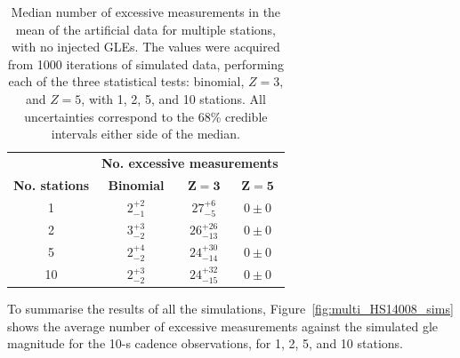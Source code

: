 \vspace{1em}

\begin{table}[ht!]
	\begin{center}
		\caption{Median number of excessive measurements in the mean of the artificial data for multiple stations, with no injected GLEs. The values were acquired from 1000 iterations of simulated data, performing each of the three statistical tests: binomial, $Z=3$, and $Z=5$, with 1, 2, 5, and 10 stations. All uncertainties correspond to the 68\% credible intervals either side of the median.}
		\label{tab:HS_14008_multi_sims_zeros}
		\begin{tabular}{c c c c}
			\hline 
			{} & \multicolumn{3}{c}{\bf No. excessive measurements} \\ 
			{\bf No. stations} & {\bf Binomial} & {\bf $\mathbf{Z=3}$} & {\bf $\mathbf{Z=5}$}  \\ 
			\hline 
			1 & $ 2^{+2}_{-1} $ & $ 27^{+6}_{-5} $ & $ 0 \pm 0 $ \\ 
			2 & $ 3^{+3}_{-2} $ & $ 26^{+26}_{-13} $ & $ 0 \pm 0 $ \\ 
			5 & $ 2^{+4}_{-2} $ & $ 24^{+30}_{-14} $ & $ 0 \pm 0 $ \\ 
			10 & $ 2^{+3}_{-2} $ & $ 24^{+32}_{-15} $ & $ 0 \pm 0 $ \\ 
			\hline 
		\end{tabular} 
	\end{center}
\end{table}
%
%

To summarise the results of all the simulations, Figure~\ref{fig:multi_HS14008_sims} shows the average number of excessive measurements against the simulated \gls{gle} magnitude for the 10-s cadence observations, for 1, 2, 5, and 10 stations. %


